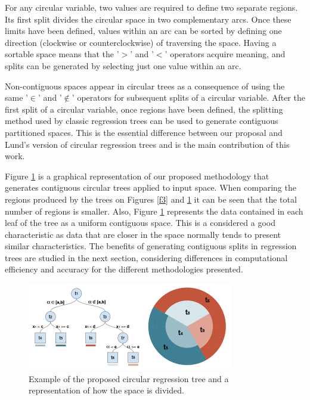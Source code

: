 \documentclass[times,twocolumn,final,authoryear]{elsarticle}
\begin{document}
For any circular variable, two values are required to define two separate regions. Its first split divides the circular space in two complementary arcs. Once these limits have been defined, values within an arc can be sorted by defining one direction (clockwise or counterclockwise) of traversing the space. Having a sortable space means that the '$>$' and '$<$' operators acquire meaning, and splits can be generated by selecting just one value within an arc.

Non-contiguous spaces appear in circular trees as a consequence of using the same '$\in$' and '$\notin$' operators for subsequent splits of a circular variable. After the first split of a circular variable, once regions have been defined, the splitting method used by classic regression trees can be used to generate contiguous partitioned spaces. This is the essential difference between our proposal and Lund's version of circular regression trees and is the main contribution of this work.

Figure \ref{f4} is a graphical representation of our proposed methodology that generates contiguous circular trees applied to input space. When comparing the regions produced by the trees on Figures \ref{f3} and \ref{f4} it can be seen that the total number of regions is smaller. Also, Figure \ref{f4} represents the data contained in each leaf of the tree as a uniform contiguous space. This is a considered a good characteristic as data that are closer in the space normally tends to present similar characteristics. The benefits of generating contiguous splits in regression trees are studied in the next section, considering differences in computational efficiency and accuracy for the different methodologies presented.

%
\begin{figure}
  \includegraphics[width=9cm]{fig4_master2.png}
\caption{Example of the proposed circular regression tree and a representation of how the space is divided.}
\label{f4}       %
\end{figure}
%
\end{document}

